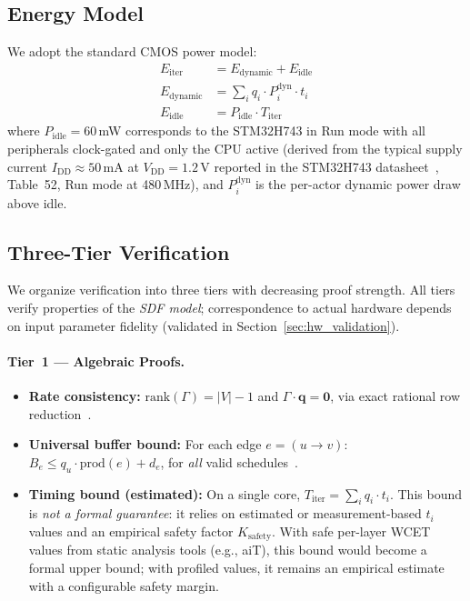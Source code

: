 \documentclass[journal]{IEEEtran}
\begin{document}
\subsection{Energy Model}

We adopt the standard CMOS power model:
\begin{align}
E_{\mathrm{iter}} &= E_{\mathrm{dynamic}} + E_{\mathrm{idle}} \label{eq:energy_total} \\
E_{\mathrm{dynamic}} &= \sum_i q_i \cdot P_i^{\mathrm{dyn}} \cdot t_i \label{eq:energy_dyn} \\
E_{\mathrm{idle}} &= P_{\mathrm{idle}} \cdot T_{\mathrm{iter}} \label{eq:energy_idle}
\end{align}
where $P_{\mathrm{idle}} = 60$\,mW corresponds to the STM32H743 in Run mode with all peripherals clock-gated and only the CPU active (derived from the typical supply current $I_{\mathrm{DD}} \approx 50$\,mA at $V_{\mathrm{DD}} = 1.2$\,V reported in the STM32H743 datasheet~\cite{stm32h743}, Table~52, Run mode at 480\,MHz), and $P_i^{\mathrm{dyn}}$ is the per-actor dynamic power draw above idle.

\subsection{Three-Tier Verification}
\label{sec:verification}

We organize verification into three tiers with decreasing proof strength.
All tiers verify properties of the \emph{SDF model}; correspondence to actual hardware depends on input parameter fidelity (validated in Section~\ref{sec:hw_validation}).

\paragraph{Tier~1 --- Algebraic Proofs.}
\begin{itemize}[nosep]
\item \textbf{Rate consistency:} $\mathrm{rank}(\Gamma) = |V| - 1$ and $\Gamma \cdot \mathbf{q} = \mathbf{0}$, via exact rational row reduction~\cite{lee1987sdf}.
\item \textbf{Universal buffer bound:} For each edge $e = (u \to v)$: $B_e \leq q_u \cdot \mathrm{prod}(e) + d_e$, for \emph{all} valid schedules~\cite{bhattacharyya1996software}.
\item \textbf{Timing bound (estimated):} On a single core, $T_{\mathrm{iter}} = \sum_i q_i \cdot t_i$. This bound is \emph{not a formal guarantee}: it relies on estimated or measurement-based $t_i$ values and an empirical safety factor $K_{\mathrm{safety}}$. With safe per-layer WCET values from static analysis tools (e.g., aiT), this bound would become a formal upper bound; with profiled values, it remains an empirical estimate with a configurable safety margin.
\end{itemize}
\end{document}
